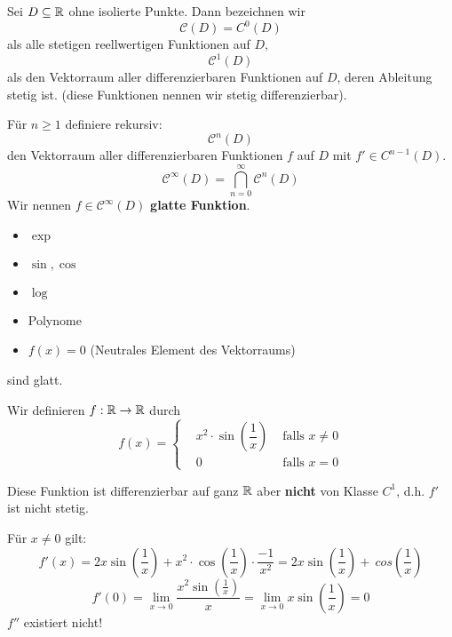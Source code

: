 \documentclass[main.tex]{subfiles}
\begin{document}
\begin{Definition}
  Sei $D \subseteq \mathbb{R}$ ohne isolierte Punkte. Dann bezeichnen wir
  $$\mathcal{C}(D) = C^0(D)$$
  als alle stetigen reellwertigen Funktionen auf $D$,
  $$\mathcal{C}^1(D)$$
  als den Vektorraum aller differenzierbaren Funktionen auf $D$, deren Ableitung stetig ist. (diese Funktionen nennen wir stetig differenzierbar).

  Für $n \geq 1$ definiere rekursiv:
  $$\mathcal{C}^n(D)$$
  den Vektorraum aller differenzierbaren Funktionen $f$ auf $D$ mit $f' \in C^{n-1}(D)$.
  $$\mathcal{C}^\infty(D)=\bigcap_{n=0}^\infty \mathcal{C}^n(D)$$
  Wir nennen $f \in \mathcal{C}^\infty (D)$ \textbf{glatte Funktion}.
\end{Definition}

\begin{Beispiel}
  \begin{itemize}
    \item $\exp$
    \item $\sin, \cos$
    \item $\log$
    \item Polynome
    \item $f(x) = 0$ (Neutrales Element des Vektorraums)
  \end{itemize}
  sind glatt.

  Wir definieren $f:\mathbb{R} \to \mathbb{R}$ durch
  $$f(x) = \left\{\begin{aligned}
    &x^2\cdot \sin\left(\dfrac{1}{x}\right) & \text{ falls } x \neq 0\\
    &0 & \text{ falls } x = 0
  \end{aligned}\right.$$
  \begin{center}
  \end{center}

  Diese Funktion ist differenzierbar auf ganz $\mathbb{R}$ aber \textbf{nicht} von Klasse $C^1$, d.h. $f'$ ist nicht stetig.

  Für $x \neq 0$ gilt:
  $$f'(x) = 2x \sin\left(\dfrac{1}{x}\right) + x^2 \cdot \cos\left(\dfrac{1}{x}\right) \cdot \dfrac{-1}{x^2} = 2x \sin\left(\dfrac{1}{x}\right) +\ cos\left(\dfrac{1}{x}\right)$$
  $$f'(0) = \lim \limits_{x \to 0} \dfrac{x^2 \sin\left(\frac{1}{x}\right)}{x} = \lim \limits_{x \to 0} x \sin\left(\dfrac{1}{x}\right) = 0$$
  $f''$ existiert nicht!
\end{Beispiel}
\end{document}
